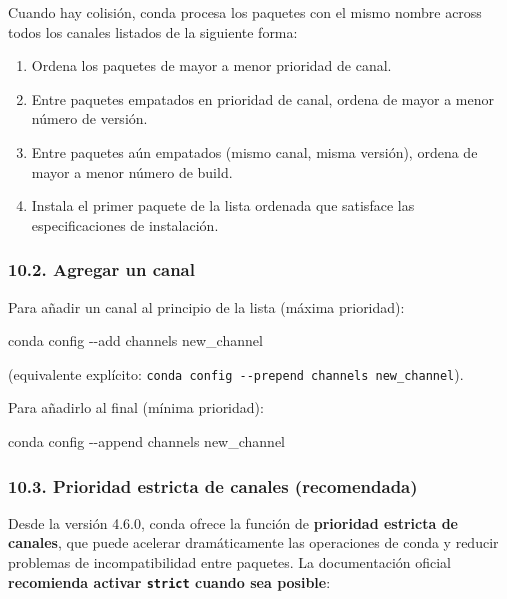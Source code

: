 \documentclass[
  doc,
  floatsintext,
  longtable,
  a4paper,
  nolmodern,
  notxfonts,
  notimes,
  12pt,
  colorlinks=true,linkcolor=blue,citecolor=blue,urlcolor=blue]{apa7}
\newenvironment{Shaded}{\begin{snugshade}}{\end{snugshade}}
\newcommand{\AttributeTok}[1]{\textcolor[rgb]{0.40,0.45,0.13}{#1}}
\newcommand{\ExtensionTok}[1]{\textcolor[rgb]{0.00,0.23,0.31}{#1}}
\newcommand{\NormalTok}[1]{\textcolor[rgb]{0.00,0.23,0.31}{#1}}
\providecommand{\tightlist}{%
  \setlength{\itemsep}{0pt}\setlength{\parskip}{0pt}}
\begin{document}
Cuando hay colisión, conda procesa los paquetes con el mismo nombre
across todos los canales listados de la siguiente forma:

\begin{enumerate}
\def\labelenumi{\arabic{enumi}.}
\tightlist
\item
  Ordena los paquetes de mayor a menor prioridad de canal.
\item
  Entre paquetes empatados en prioridad de canal, ordena de mayor a
  menor número de versión.
\item
  Entre paquetes aún empatados (mismo canal, misma versión), ordena de
  mayor a menor número de build.
\item
  Instala el primer paquete de la lista ordenada que satisface las
  especificaciones de instalación.
\end{enumerate}

\subsubsection{10.2. Agregar un canal}\label{agregar-un-canal}

Para añadir un canal al principio de la lista (máxima prioridad):

\begin{Shaded}
\begin{Highlighting}[]
\ExtensionTok{conda}\NormalTok{ config }\AttributeTok{{-}{-}add}\NormalTok{ channels new\_channel}
\end{Highlighting}
\end{Shaded}

(equivalente explícito:
\texttt{conda\ config\ -\/-prepend\ channels\ new\_channel}).

Para añadirlo al final (mínima prioridad):

\begin{Shaded}
\begin{Highlighting}[]
\ExtensionTok{conda}\NormalTok{ config }\AttributeTok{{-}{-}append}\NormalTok{ channels new\_channel}
\end{Highlighting}
\end{Shaded}

\subsubsection{10.3. Prioridad estricta de canales
(recomendada)}\label{prioridad-estricta-de-canales-recomendada}

Desde la versión 4.6.0, conda ofrece la función de \textbf{prioridad
estricta de canales}, que puede acelerar dramáticamente las operaciones
de conda y reducir problemas de incompatibilidad entre paquetes. La
documentación oficial \textbf{recomienda activar \texttt{strict} cuando
sea posible}:
\end{document}
